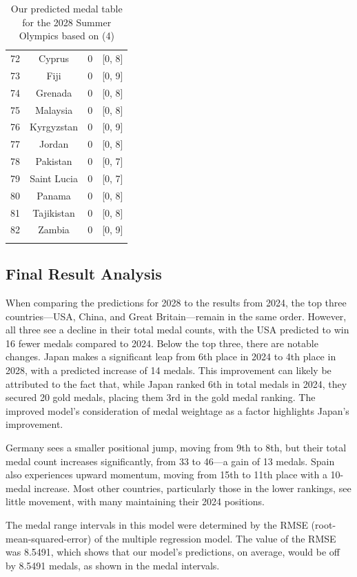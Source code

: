 \documentclass{mcmthesis}
\begin{document}
\begin{longtable}{rccc}
72 & Cyprus & 0 & [0, 8] \\
73 & Fiji & 0 & [0, 9] \\
74 & Grenada & 0 & [0, 8] \\
75 & Malaysia & 0 & [0, 8] \\
76 & Kyrgyzstan & 0 & [0, 9] \\
77 & Jordan & 0 & [0, 8] \\
78 & Pakistan & 0 & [0, 7] \\
79 & Saint Lucia & 0 & [0, 7] \\
80 & Panama & 0 & [0, 8] \\
81 & Tajikistan & 0 & [0, 8] \\
82 & Zambia & 0 & [0, 9] \\
\bottomrule
\caption{Our predicted medal table for the 2028 Summer Olympics based on (4)}
\end{longtable}

\subsection{Final Result Analysis}

When comparing the predictions for 2028 to the results from 2024, the top three countries—USA, China, and Great Britain—remain in the same order. However, all three see a decline in their total medal counts, with the USA predicted to win 16 fewer medals compared to 2024. Below the top three, there are notable changes. Japan makes a significant leap from 6th place in 2024 to 4th place in 2028, with a predicted increase of 14 medals. This improvement can likely be attributed to the fact that, while Japan ranked 6th in total medals in 2024, they secured 20 gold medals, placing them 3rd in the gold medal ranking. The improved model's consideration of medal weightage as a factor highlights Japan's improvement.

\par Germany sees a smaller positional jump, moving from 9th to 8th, but their total medal count increases significantly, from 33 to 46—a gain of 13 medals. Spain also experiences upward momentum, moving from 15th to 11th place with a 10-medal increase. Most other countries, particularly those in the lower rankings, see little movement, with many maintaining their 2024 positions. 

\par The medal range intervals in this model were determined by the RMSE (root-mean-squared-error) of the multiple regression model. The value of the RMSE was 8.5491, which shows that our model's predictions, on average, would be off by 8.5491 medals, as shown in the medal intervals.
\end{document}
